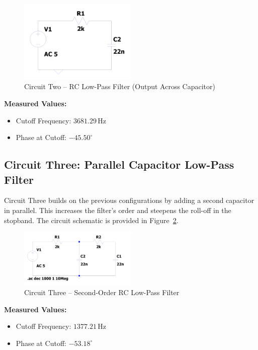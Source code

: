 \documentclass[12pt]{article}
\begin{document}
\begin{figure}[H]
	\centering
	\includegraphics[width=0.5\textwidth]{e6_02}
	\caption{Circuit Two – RC Low-Pass Filter (Output Across Capacitor)}
	\label{fig:circuittwo}
\end{figure}

\noindent \textbf{Measured Values:}
\begin{itemize}
	\item Cutoff Frequency: $3681.29\,\mathrm{Hz}$
	\item Phase at Cutoff: $-45.50^\circ$
\end{itemize}

\subsection{Circuit Three: Parallel Capacitor Low-Pass Filter}
Circuit Three builds on the previous configurations by adding a second capacitor in parallel. This increases the filter's order and steepens the roll-off in the stopband. The circuit schematic is provided in Figure~\ref{fig:circuitthree}.

\begin{figure}[H]
	\centering
	\includegraphics[width=0.5\textwidth]{e6_03}
	\caption{Circuit Three – Second-Order RC Low-Pass Filter}
	\label{fig:circuitthree}
\end{figure}

\noindent \textbf{Measured Values:}
\begin{itemize}
	\item Cutoff Frequency: $1377.21\,\mathrm{Hz}$
	\item Phase at Cutoff: $-53.18^\circ$
\end{itemize}
\end{document}
